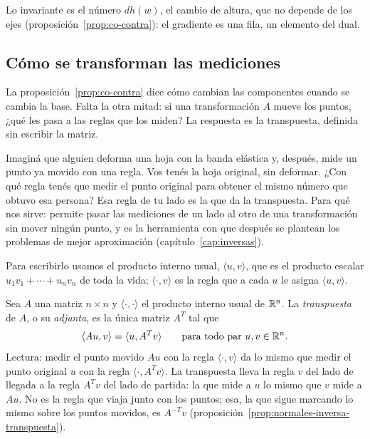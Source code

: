 \begin{idea}
Lo invariante es el número \(dh(w)\), el cambio de altura, que no depende de los ejes
(proposición~\ref{prop:co-contra}): el gradiente es una fila, un elemento del dual.
\end{idea}

\subsection{Cómo se transforman las mediciones}\label{sec:transpuesta-normales}

La proposición~\ref{prop:co-contra} dice cómo cambian las componentes cuando se cambia la
base. Falta la otra mitad: si una transformación \(A\) mueve los puntos, ¿qué les pasa a las
reglas que los miden? La respuesta es la transpuesta, definida sin escribir la matriz.

Imaginá que alguien deforma una hoja con la banda elástica y, después, mide un punto ya movido
con una regla. Vos tenés la hoja original, sin deformar. ¿Con qué regla tenés que medir el
punto original para obtener el mismo número que obtuvo esa persona? Esa regla de tu lado es la
que da la transpuesta. Para qué nos sirve: permite pasar las mediciones de un lado al otro de
una transformación sin mover ningún punto, y es la herramienta con que después se plantean los
problemas de mejor aproximación (capítulo~\ref{cap:inversas}).

Para escribirlo usamos el producto interno usual, \(\langle u,v\rangle\), que es el producto
escalar \(u_1v_1+\cdots+u_nv_n\) de toda la vida; \(\langle\cdot,v\rangle\) es la regla que a
cada \(u\) le asigna \(\langle u,v\rangle\).

\begin{definicion}\label{def:transpuesta-adjunta}
Sea \(A\) una matriz \(n\times n\) y \(\langle\cdot,\cdot\rangle\) el producto interno usual
de \(\mathbb{R}^n\). La \emph{transpuesta} de \(A\), o su \emph{adjunta}, es la única matriz
\(A^T\) tal que
\[
  \langle Au,v\rangle=\langle u,A^Tv\rangle\qquad\text{para todo par }u,v\in\mathbb{R}^n .
\]
Lectura: medir el punto movido \(Au\) con la regla \(\langle\cdot,v\rangle\) da lo mismo que
medir el punto original \(u\) con la regla \(\langle\cdot,A^Tv\rangle\). La transpuesta lleva
la regla \(v\) del lado de llegada a la regla \(A^Tv\) del lado de partida: la que mide a
\(u\) lo mismo que \(v\) mide a \(Au\). No es la regla que viaja junto con los puntos; esa,
la que sigue marcando lo mismo sobre los puntos movidos, es \(A^{-T}v\)
(proposición~\ref{prop:normales-inversa-transpuesta}).
\end{definicion}

